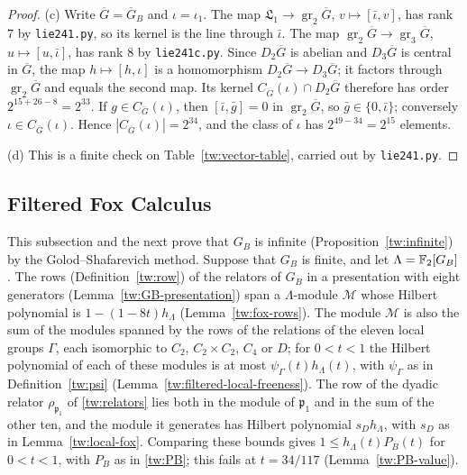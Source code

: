 \begin{proof}
(c) Write $\overline G=\overline G_B$ and $\iota=\iota_1$. The map
$\mathfrak L_1\to\operatorname{gr}_2\overline G$, $v\mapsto[\bar\iota,v]$, has
rank $7$ by \texttt{lie241.py}, so its kernel is the line through
$\bar\iota$. The map
$\operatorname{gr}_2\overline G\to\operatorname{gr}_3\overline G$,
$u\mapsto[u,\bar\iota]$, has rank $8$ by \texttt{lie241c.py}. Since
$D_2\overline G$ is abelian and $D_3\overline G$ is central in $\overline G$,
the map $h\mapsto[h,\iota]$ is a homomorphism $D_2\overline G\to D_3\overline G$;
it factors through $\operatorname{gr}_2\overline G$ and equals the second map.
Its kernel $C_{\overline G}(\iota)\cap D_2\overline G$ therefore has order
$2^{15+26-8}=2^{33}$. If $g\in C_{\overline G}(\iota)$, then
$[\bar\iota,\bar g]=0$ in $\operatorname{gr}_2\overline G$, so
$\bar g\in\{0,\bar\iota\}$; conversely $\iota\in C_{\overline G}(\iota)$.
Hence $|C_{\overline G}(\iota)|=2^{34}$, and the class of $\iota$ has
$2^{49-34}=2^{15}$ elements.

(d) This is a finite check on Table~\ref{tw:vector-table}, carried out by
\texttt{lie241.py}.
\end{proof}

\subsection{Filtered Fox Calculus}\label{tw:fox-section}
This subsection and the next prove that $G_B$ is infinite
(Proposition~\ref{tw:infinite}) by the Golod--Shafarevich method. Suppose
that $G_B$ is finite, and let $\Lambda=\mathbb F_2[G_B]$. The rows
(Definition~\ref{tw:row}) of the relators of $G_B$ in a presentation with
eight generators (Lemma~\ref{tw:GB-presentation}) span a $\Lambda$-module
$\mathcal M$ whose Hilbert polynomial is $1-(1-8t)h_\Lambda$
(Lemma~\ref{tw:fox-rows}). The module $\mathcal M$ is also the sum of the
modules spanned by the rows of the relations of the eleven local groups
$\Gamma$, each isomorphic to $C_2$, $C_2\times C_2$, $C_4$ or $D$; for $0<t<1$
the Hilbert polynomial of each of these modules is at most
$\psi_\Gamma(t)h_\Lambda(t)$, with $\psi_\Gamma$ as in
Definition~\ref{tw:psi} (Lemma~\ref{tw:filtered-local-freeness}). The row of
the dyadic relator $\rho_{\mathfrak p_1}$ of \eqref{tw:relators} lies both in
the module of $\mathfrak p_1$ and in the sum of the other ten, and the module
it generates has Hilbert polynomial $s_Dh_\Lambda$, with $s_D$ as in
Lemma~\ref{tw:local-fox}. Comparing these bounds gives
$1\le h_\Lambda(t)P_B(t)$ for $0<t<1$, with $P_B$ as in \eqref{tw:PB}; this
fails at $t=34/117$ (Lemma~\ref{tw:PB-value}).

